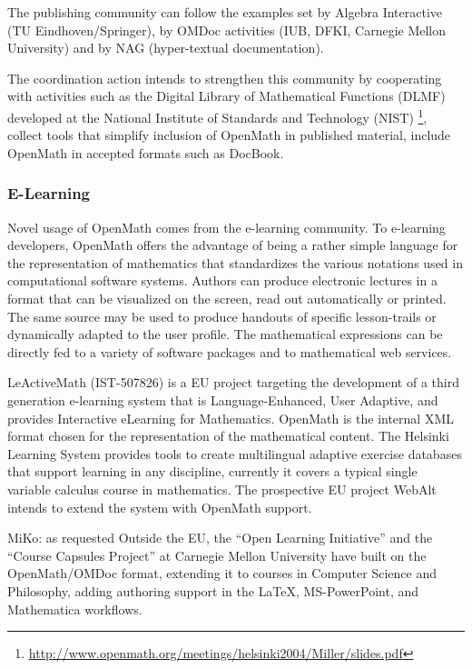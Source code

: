 \documentclass{euproposal}
\begin{document}
The publishing community can follow the examples set by Algebra
Interactive (TU Eindhoven/Springer), by OMDoc activities (IUB, DFKI,
Carnegie Mellon University) and by NAG (hyper-textual documentation).

The coordination action intends to strengthen this community by
cooperating with activities such as the Digital Library of
Mathematical Functions (DLMF) developed at the National Institute of
Standards and Technology (NIST)
\footnote{\url{http://www.openmath.org/meetings/helsinki2004/Miller/slides.pdf}},
collect tools that simplify inclusion of OpenMath in published
material, include OpenMath in accepted formats such as DocBook.


\subsubsection{E-Learning}\label{sec:e-learn}
Novel usage of OpenMath comes from the e-learning community. To
e-learning developers, OpenMath offers the advantage of being a rather
simple language for the representation of mathematics that
standardizes the various notations used in computational software
systems. Authors can produce electronic lectures in a format that can
be visualized on the screen, read out automatically or printed. The
same source may be used to produce handouts of specific lesson-trails
or dynamically adapted to the user profile. The mathematical
expressions can be directly fed to a variety of software packages and
to mathematical web services.

LeActiveMath (IST-507826) is a EU project targeting the development of
a third generation e-learning system that is Language-Enhanced, User
Adaptive, and provides Interactive eLearning for Mathematics. OpenMath
is the internal XML format chosen for the representation of the
mathematical content.  The Helsinki Learning System provides tools to
create multilingual adaptive exercise databases that support learning
in any discipline, currently it covers a typical single variable
calculus course in mathematics. The prospective EU project WebAlt
intends to extend the system with OpenMath support.

\begin{newpart}{MiKo: as requested}
  Outside the EU, the ``Open Learning Initiative'' and the ``Course Capsules
  Project'' at Carnegie Mellon University have built on the OpenMath/OMDoc format,
  extending it to courses in Computer Science and Philosophy, adding authoring
  support in the {\LaTeX}, MS-PowerPoint, and Mathematica workflows.
\end{newpart}
\end{document}
